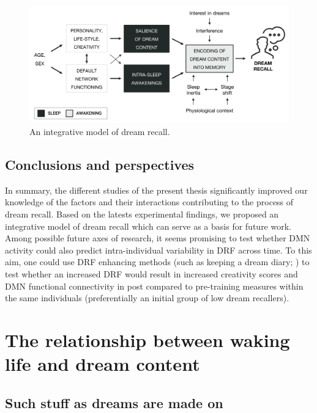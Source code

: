 \begin{figure}[!htbp]
	\includegraphics[width=\textwidth]{Fig/Discussion/schema_dream_recall.png}
	\caption[An integrative model of dream recall]{An integrative model of dream recall.}
	\label{fig:disc:drf:model}
\end{figure}

\section{Conclusions and perspectives}
\label{disc:drf:perspectives}

In summary, the different studies of the present thesis significantly improved our knowledge of the factors and their interactions contributing to the process of dream recall. Based on the latests experimental findings, we proposed an integrative model of dream recall which can serve as a basis for future work. Among possible future axes of research, it seems promising to test whether DMN activity could also predict intra-individual variability in DRF across time. To this aim, one could use DRF enhancing methods (such as keeping a dream diary; \citealp{schredl_questionnaires_2002}) to test whether an increased DRF would result in increased creativity scores and DMN functional connectivity in post compared to pre-training measures within the same individuals (preferentially an initial group of low dream recallers).

\cleardoublepage
\chapter{The relationship between waking life and dream content}
\label{disc:wle}

\section{Such stuff as dreams are made on}
\label{disc:drf:summary:residue}

